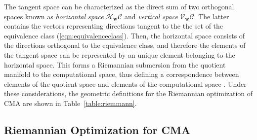 The tangent space can be characterized as the direct sum of two orthogonal spaces known as \emph{horizontal space} $\mathcal{H}_{\bm{w}}\mathcal{C}$ and \emph{vertical space} $\mathcal{V}_{\bm{w}}\mathcal{C}$. The latter contains the vectors representing directions tangent to the the set of the equivalence class (\ref{eqn:equivalenceclass}). Then, the horizontal space consists of the directions orthogonal to the equivalence class, and therefore the elements of the tangent space can be represented by an unique element belonging to the horizontal space. This forms a Riemannian submersion from the quotient manifold to the computational space, thus defining a correspondence between elements of the quotient space and elements of the computational space \cite{Absil2008book}.
Under these considerations, the geometric definitions for the Riemannian optimization of CMA are shown in Table~\ref{table:riemmann}.

\subsection{Riemannian Optimization for CMA}

